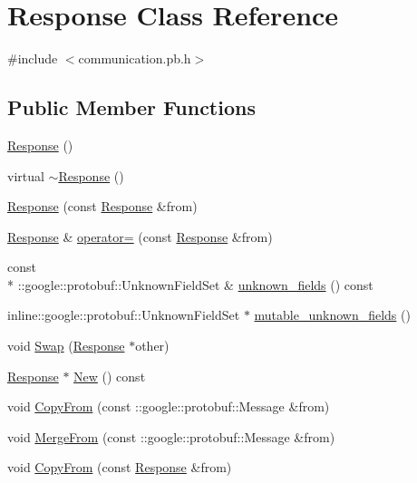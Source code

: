 \hypertarget{classResponse}{\section{Response Class Reference}
\label{classResponse}
}


{\ttfamily \#include $<$communication.\-pb.\-h$>$}

\subsection*{Public Member Functions}
\begin{DoxyCompactItemize}
\item 
\hyperlink{classResponse_aa9b6e391d77fce8daca8bac13730ec8e}{Response} ()
\item 
virtual \hyperlink{classResponse_a2a4a6403aaefce73725f17cf63896f84}{$\sim$\-Response} ()
\item 
\hyperlink{classResponse_abea00a908d82a1d64043ca8139d87451}{Response} (const \hyperlink{classResponse}{Response} \&from)
\item 
\hyperlink{classResponse}{Response} \& \hyperlink{classResponse_aa566114a2c21a83b740eedd6c85c01d7}{operator=} (const \hyperlink{classResponse}{Response} \&from)
\item 
const \\*
\-::google\-::protobuf\-::\-Unknown\-Field\-Set \& \hyperlink{classResponse_aa69cd21b85bead07e21990cfd06e89b4}{unknown\-\_\-fields} () const 
\item 
inline\-::google\-::protobuf\-::\-Unknown\-Field\-Set $\ast$ \hyperlink{classResponse_a6557bbc064865d9cbeb946ddc8e99c1b}{mutable\-\_\-unknown\-\_\-fields} ()
\item 
void \hyperlink{classResponse_a54eba0305e68f968b85f477163ceaa2e}{Swap} (\hyperlink{classResponse}{Response} $\ast$other)
\item 
\hyperlink{classResponse}{Response} $\ast$ \hyperlink{classResponse_a1289b6db99f8a63adc624fbfa815ca64}{New} () const 
\item 
void \hyperlink{classResponse_a51b841daed7959eeb2e87c078827a6d3}{Copy\-From} (const \-::google\-::protobuf\-::\-Message \&from)
\item 
void \hyperlink{classResponse_a8d3811e587516a1ac53461514027d23a}{Merge\-From} (const \-::google\-::protobuf\-::\-Message \&from)
\item 
void \hyperlink{classResponse_a849f4fc01302bb353e10638f4df348e9}{Copy\-From} (const \hyperlink{classResponse}{Response} \&from)

\end{DoxyCompactItemize}
